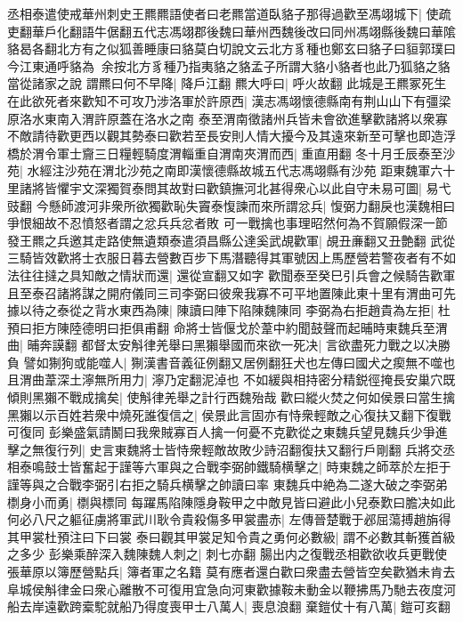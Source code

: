 丞相泰遣使戒華州刺史王羆羆語使者曰老羆當道臥貉子那得過歡至馮翊城下|{
	使疏吏翻華戶化翻語牛倨翻五代志馮翊郡後魏曰華州西魏後改曰同州馮翊縣後魏曰華隂貉曷各翻北方有之似狐善睡康曰貉莫白切說文云北方豸種也鄭玄曰貉子曰貆郭璞曰今江東通呼貉為余按北方豸種乃指夷貉之貉孟子所謂大貉小貉者也此乃狐貉之貉當從諸家之說}
謂羆曰何不早降|{
	降戶江翻}
羆大呼曰|{
	呼火故翻}
此城是王羆冢死生在此欲死者來歡知不可攻乃涉洛軍於許原西|{
	漢志馮翊懷德縣南有荆山山下有彊梁原洛水東南入渭許原蓋在洛水之南}
泰至渭南徵諸州兵皆未會欲進擊歡諸將以衆寡不敵請待歡更西以觀其勢泰曰歡若至長安則人情大擾今及其遠來新至可擊也即造浮橋於渭令軍士齎三日糧輕騎度渭輜重自渭南夾渭而西|{
	重直用翻}
冬十月壬辰泰至沙苑|{
	水經注沙苑在渭北沙苑之南即漢懷德縣故城五代志馮翊縣有沙苑}
距東魏軍六十里諸將皆懼宇文深獨賀泰問其故對曰歡鎮撫河北甚得衆心以此自守未易可圖|{
	易弋豉翻}
今懸師渡河非衆所欲獨歡恥失竇泰愎諫而來所謂忿兵|{
	愎弼力翻戾也漢魏相曰爭恨細故不忍憤怒者謂之忿兵兵忿者敗}
可一戰擒也事理昭然何為不賀願假深一節發王羆之兵邀其走路使無遺類泰遣須昌縣公達奚武覘歡軍|{
	覘丑亷翻又丑艶翻}
武從三騎皆效歡將士衣服日暮去營數百步下馬潛聽得其軍號因上馬歷營若警夜者有不如法往往撻之具知敵之情狀而還|{
	還從宣翻又如字}
歡聞泰至癸巳引兵會之候騎告歡軍且至泰召諸將謀之開府儀同三司李弼曰彼衆我寡不可平地置陳此東十里有渭曲可先據以待之泰從之背水東西為陳|{
	陳讀曰陣下陷陳魏陳同}
李弼為右拒趙貴為左拒|{
	杜預曰拒方陳陸德明曰拒俱甫翻}
命將士皆偃戈於葦中約聞鼓聲而起晡時東魏兵至渭曲|{
	晡奔謨翻}
都督太安斛律羌舉曰黑獺舉國而來欲一死决|{
	言欲盡死力戰之以决勝負}
譬如猘狗或能噬人|{
	猘漢書音義征例翻又居例翻狂犬也左傳曰國犬之瘈無不噬也}
且渭曲葦深土濘無所用力|{
	濘乃定翻泥淖也}
不如緩與相持密分精鋭徑掩長安巢穴既傾則黑獺不戰成擒矣|{
	使斛律羌舉之計行西魏殆哉}
歡曰縱火焚之何如侯景曰當生擒黑獺以示百姓若衆中燒死誰復信之|{
	侯景此言固亦有恃衆輕敵之心復扶又翻下復戰可復同}
彭樂盛氣請鬭曰我衆賊寡百人擒一何憂不克歡從之東魏兵望見魏兵少爭進擊之無復行列|{
	史言東魏將士皆恃衆輕敵故敗少詩沼翻復扶又翻行戶剛翻}
兵將交丞相泰鳴鼓士皆奮起于謹等六軍與之合戰李弼帥鐵騎横擊之|{
	時東魏之師萃於左拒于謹等與之合戰李弼引右拒之騎兵横擊之帥讀曰率}
東魏兵中絶為二遂大破之李弼弟檦身小而勇|{
	檦與標同}
每躍馬陷陳隱身鞍甲之中敵見皆曰避此小兒泰歎曰膽决如此何必八尺之軀征虜將軍武川耿令貴殺傷多甲裳盡赤|{
	左傳晉楚戰于邲屈蕩搏趙旃得其甲裳杜預注曰下曰裳}
泰曰觀其甲裳足知令貴之勇何必數級|{
	謂不必數其斬獲首級之多少}
彭樂乘醉深入魏陳魏人刺之|{
	刺七亦翻}
腸出内之復戰丞相歡欲收兵更戰使張華原以簿歷營點兵|{
	簿者軍之名籍}
莫有應者還白歡曰衆盡去營皆空矣歡猶未肯去阜城侯斛律金曰衆心離散不可復用宜急向河東歡據鞍未動金以鞭拂馬乃馳去夜度河船去岸遠歡跨槖駝就船乃得度喪甲士八萬人|{
	喪息浪翻}
棄鎧仗十有八萬|{
	鎧可亥翻}
